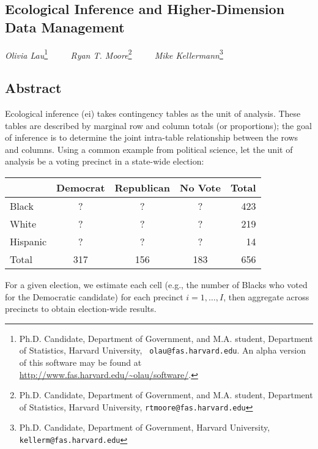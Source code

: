 \documentclass[10pt]{article}
\begin{document}
\pagestyle{empty}
\begin{center}
\section*{Ecological Inference and Higher-Dimension Data
Management}
\emph{Olivia Lau}\footnote{Ph.D. Candidate, Department of Government,
and M.A. student, Department of Statistics, Harvard University, {\tt
olau@fas.harvard.edu}.  An alpha version of this software may be found
at \url{http://www.fas.harvard.edu/~olau/software/}.}
\mbox{$\quad\quad$} \emph{Ryan T. Moore}\footnote{Ph.D. Candidate,
Department of Government, and M.A. student, Department of Statistics,
Harvard University, {\tt rtmoore@fas.harvard.edu}} \mbox{$\quad\quad$} \emph{Mike
Kellermann}\footnote{Ph.D. Candidate, Department of Government,
Harvard University, {\tt kellerm@fas.harvard.edu}}
\end{center}

\subsection*{Abstract}

Ecological inference ({\sc ei}) takes contingency tables as the unit
of analysis.  These tables are described by marginal row and column totals (or
proportions); the goal of inference is to determine the joint
intra-table relationship between the rows and columns.  Using a common
example from political science, let the unit of analysis be a voting
precinct in a state-wide election:  
\begin{center}
\begin{tabular}{l|ccc|r}
      & Democrat & Republican & No Vote & Total \\
\hline
Black & ?        &  ?         &  ?      & 423 \\
White & ?        & ?          &  ?      & 219 \\
Hispanic & ?     & ?          &  ?      & 14 \\
\hline
Total  & 317     & 156        & 183     & 656 
\end{tabular}
\end{center}
For a given election, we estimate each cell (e.g., the number of
Blacks who voted for the Democratic candidate) for each precinct $i = 1,
\dots, I$, then aggregate across precincts to obtain election-wide results. 
\end{document}
